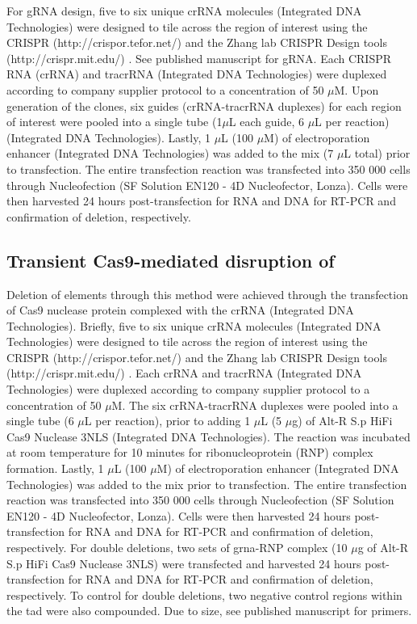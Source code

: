 For gRNA design, five to six unique crRNA molecules (Integrated DNA Technologies) were designed to tile across the region of interest using the CRISPR (http://crispor.tefor.net/) \cite{haeusslerEvaluationOfftargetOntarget2016} and the Zhang lab CRISPR Design tools (http://crispr.mit.edu/) \cite{hsuDNATargetingSpecificity2013}.
See published manuscript for gRNA.
Each CRISPR RNA (crRNA) and tracrRNA (Integrated DNA Technologies) were duplexed according to company supplier protocol to a concentration of 50 $\mu$M.
Upon generation of the clones, six guides (crRNA-tracrRNA duplexes) for each region of interest were pooled into a single tube (1$\mu$L each guide, 6 $\mu$L per reaction) (Integrated DNA Technologies).
Lastly, 1 $\mu$L (100 $\mu$M) of electroporation enhancer (Integrated DNA Technologies) was added to the mix (7 $\mu$L total) prior to transfection.
The entire transfection reaction was transfected into 350 000 cells through Nucleofection (SF Solution EN120 - 4D Nucleofector, Lonza).
Cells were then harvested 24 hours post-transfection for RNA and DNA for RT-PCR and confirmation of deletion, respectively.

\subsection{Transient Cas9-mediated disruption of }

Deletion of elements through this method were achieved through the transfection of Cas9 nuclease protein complexed with the crRNA (Integrated DNA Technologies).
Briefly, five to six unique crRNA molecules (Integrated DNA Technologies) were designed to tile across the region of interest using the CRISPR (http://crispor.tefor.net/) \cite{haeusslerEvaluationOfftargetOntarget2016} and the Zhang lab CRISPR Design tools (http://crispr.mit.edu/) \cite{hsuDNATargetingSpecificity2013}.
Each crRNA and tracrRNA (Integrated DNA Technologies) were duplexed according to company supplier protocol to a concentration of 50 $\mu$M.
The six crRNA-tracrRNA duplexes were pooled into a single tube (6 $\mu$L per reaction), prior to adding 1 $\mu$L (5 $\mu$g) of Alt-R \textregistered S.p HiFi Cas9 Nuclease 3NLS (Integrated DNA Technologies).
The reaction was incubated at room temperature for 10 minutes for ribonucleoprotein (RNP) complex formation.
Lastly, 1 $\mu$L (100 $\mu$M) of electroporation enhancer (Integrated DNA Technologies) was added to the mix prior to transfection.
The entire transfection reaction was transfected into 350 000 cells through Nucleofection (SF Solution EN120 - 4D Nucleofector, Lonza).
Cells were then harvested 24 hours post-transfection for RNA and DNA for RT-PCR and confirmation of deletion, respectively.
For double deletions, two sets of \gls{grna}-RNP complex (10 $\mu$g of Alt-R \textregistered S.p HiFi Cas9 Nuclease 3NLS) were transfected and harvested 24 hours post-transfection for RNA and DNA for RT-PCR and confirmation of deletion, respectively.
To control for double deletions, two negative control regions within the \gls{tad} were also compounded.
Due to size, see published manuscript for primers.

